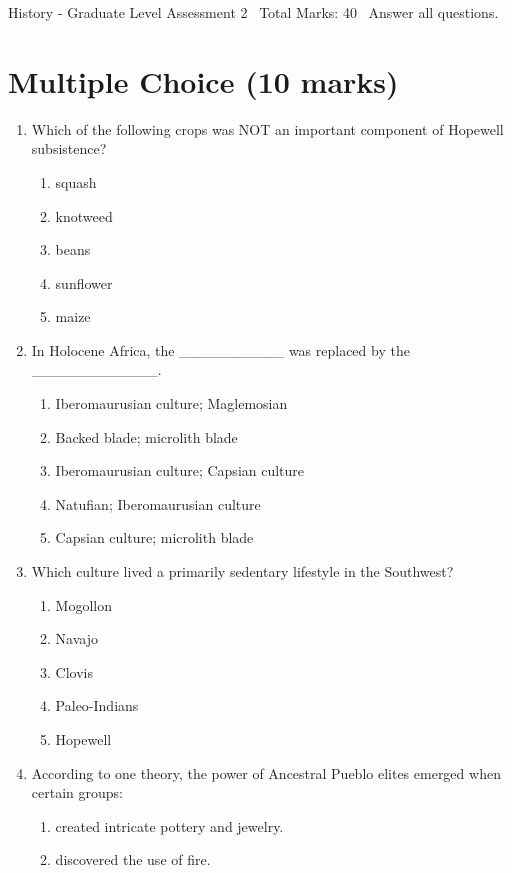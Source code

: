\documentclass[12pt]{article}
\begin{document}
\begin{center}
History - Graduate Level Assessment 2 \
Total Marks: 40 \
Answer all questions.
\end{center}

\section*{Multiple Choice (10 marks)}
\begin{enumerate}[label=\arabic*.]
\item Which of the following crops was NOT an important component of Hopewell subsistence?
\begin{enumerate}[label=(\alph*)]
    \item squash
    \item knotweed
    \item beans
    \item sunflower
    \item maize
\end{enumerate}
\item In Holocene Africa, the \_\_\_\_\_\_\_\_\_\_ was replaced by the \_\_\_\_\_\_\_\_\_\_\_\_.
\begin{enumerate}[label=(\alph*)]
    \item Iberomaurusian culture; Maglemosian
    \item Backed blade; microlith blade
    \item Iberomaurusian culture; Capsian culture
    \item Natufian; Iberomaurusian culture
    \item Capsian culture; microlith blade
\end{enumerate}
\item Which culture lived a primarily sedentary lifestyle in the Southwest?
\begin{enumerate}[label=(\alph*)]
    \item Mogollon
    \item Navajo
    \item Clovis
    \item Paleo-Indians
    \item Hopewell
\end{enumerate}
\item According to one theory, the power of Ancestral Pueblo elites emerged when certain groups:
\begin{enumerate}[label=(\alph*)]
    \item created intricate pottery and jewelry.
    \item discovered the use of fire.

\end{enumerate}
\end{enumerate}
\end{document}
